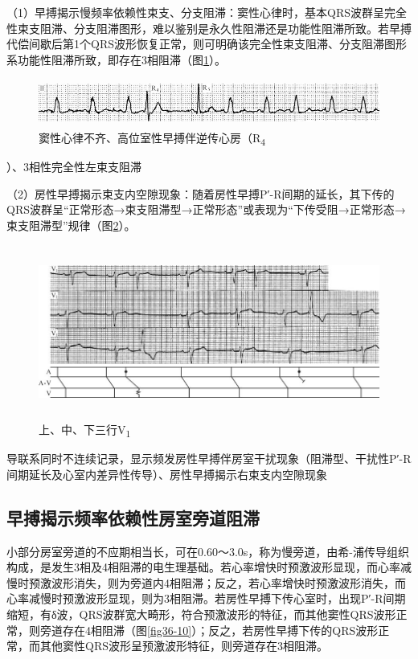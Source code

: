 （1）早搏揭示慢频率依赖性束支、分支阻滞：窦性心律时，基本QRS波群呈完全性束支阻滞、分支阻滞图形，难以鉴别是永久性阻滞还是功能性阻滞所致。若早搏代偿间歇后第1个QRS波形恢复正常，则可明确该完全性束支阻滞、分支阻滞图形系功能性阻滞所致，即存在3相阻滞（图\ref{fig36-8}）。

\begin{figure}[!htbp]
 \centering
 \includegraphics[width=5.58333in,height=0.61458in]{./images/Image00580.jpg}
 \captionsetup{justification=centering}
 \caption{窦性心律不齐、高位室性早搏伴逆传心房（R\textsubscript{4}}
 \label{fig36-8}
  \end{figure} 
）、3相性完全性左束支阻滞

（2）房性早搏揭示束支内空隙现象：随着房性早搏P′-R间期的延长，其下传的QRS波群呈“正常形态→束支阻滞型→正常形态”或表现为“下传受阻→正常形态→束支阻滞型”规律（图\ref{fig36-9}）。

\begin{figure}[!htbp]
 \centering
 \includegraphics[width=5.79167in,height=2.25in]{./images/Image00581.jpg}
 \captionsetup{justification=centering}
 \caption{上、中、下三行V\textsubscript{1}}
 \label{fig36-9}
  \end{figure} 
导联系同时不连续记录，显示频发房性早搏伴房室干扰现象（阻滞型、干扰性P′-R间期延长及心室内差异性传导）、房性早搏揭示右束支内空隙现象

\protect\hypertarget{text00043.htmlux5cux23subid473}{}{}

\subsection{早搏揭示频率依赖性房室旁道阻滞}

小部分房室旁道的不应期相当长，可在0.60～3.0s，称为慢旁道，由希-浦传导组织构成，是发生3相及4相阻滞的电生理基础。若心率增快时预激波形显现，而心率减慢时预激波形消失，则为旁道内4相阻滞；反之，若心率增快时预激波形消失，而心率减慢时预激波形显现，则为3相阻滞。若房性早搏下传心室时，出现P′-R间期缩短，有δ波，QRS波群宽大畸形，符合预激波形的特征，而其他窦性QRS波形正常，则旁道存在4相阻滞（图\ref{fig36-10}）；反之，若房性早搏下传的QRS波形正常，而其他窦性QRS波形呈预激波形特征，则旁道存在3相阻滞。

